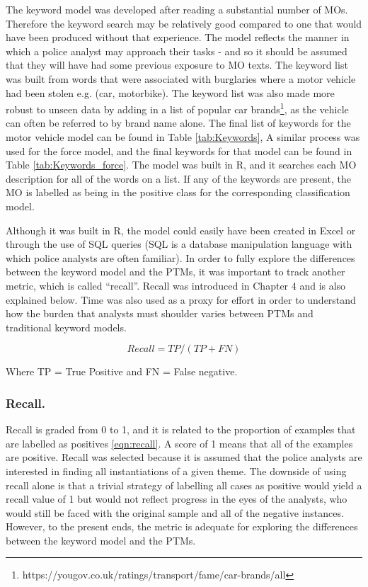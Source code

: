 The keyword model was developed after reading a substantial number of MOs. Therefore the keyword search may be relatively good compared to one that would have been produced without that experience. The model reflects the manner in which a police analyst may approach their tasks - and so it should be assumed that they will have had some previous exposure to MO texts. The keyword list was built from words that were associated with burglaries where a motor vehicle had been stolen e.g. (car, motorbike). The keyword list was also made more robust to unseen data by adding in a list of popular car brands\footnote{https://yougov.co.uk/ratings/transport/fame/car-brands/all}, as the vehicle can often be referred to by brand name alone. The final list of keywords for the motor vehicle model can be found in Table \ref{tab:Keywords}, A similar process was used for the force model, and the final keywords for that model can be found in Table \ref{tab:Keywords_force}. The model was built in R, and it searches each MO description for all of the words on a list. If any of the keywords are present, the MO is labelled as being in the positive class for the corresponding classification model.

Although it was built in R, the model could easily have been created in Excel or through the use of SQL queries (SQL is a database manipulation language with which police analysts are often familiar). In order to fully explore the differences between the keyword model and the PTMs, it was important to track another metric, which is called “recall”. Recall was introduced in Chapter 4 and is also explained below. Time was also used as a proxy for effort in order to understand how the burden that analysts must shoulder varies between PTMs and traditional keyword models.

\begin{equation}
 Recall = TP / (TP + FN)
 \label{eqn:recall}
\end{equation}

Where TP = True Positive and FN = False negative.
\subsubsection{Recall.} Recall is graded from 0 to 1, and it is related to the proportion of examples that are labelled as positives \ref{eqn:recall}. A score of 1 means that all of the examples are positive. Recall was selected because it is assumed that the police analysts are interested in finding all instantiations of a given theme. The downside of using recall alone is that a trivial strategy of labelling all cases as positive would yield a recall value of 1 but would not reflect progress in the eyes of the analysts, who would still be faced with the original sample and all of the negative instances. However, to the present ends, the metric is adequate for exploring the differences between the keyword model and the PTMs.


